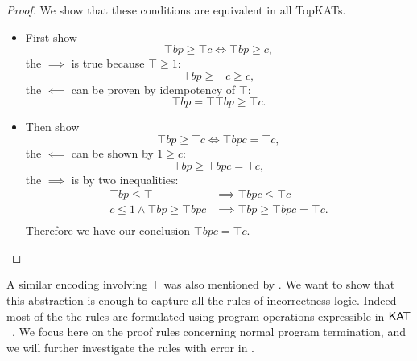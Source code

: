 \begin{proof}
We show that these conditions are equivalent in all TopKATs.
\begin{itemize}
    \item First show \[\top b p \geq \top c \iff \top b p \geq c,\]
    the \(\implies\) is true because \(\top \geq 1\):
    \[\top b p \geq \top c \geq c,\]
    the \(\impliedby\) can be proven by idempotency of \(\top\):
    \[\top b p = \top \top b p \geq \top c.\]
    \item Then show \[\top b p \geq \top c \iff \top b p c = \top c,\]
    the \(\impliedby\) can be shown by \(1 \geq c\):
    \[\top b p \geq \top b p c = \top c,\]
    the \(\implies\) is by two inequalities:
    \begin{align*}
        \top b p \leq \top & \implies \top b p c \leq \top c \\
        c \leq 1 \land \top b p \geq \top b p c & \implies \top b p \geq \top b p c = \top c.\\
    \end{align*}
    Therefore we have our conclusion \(\top b p c = \top c\). \qedhere
\end{itemize}
\end{proof}

A similar encoding involving \(\top\) was also mentioned by \citet{OHearn_2020}.
We want to show that this abstraction is enough to capture all the rules of
incorrectness logic.  Indeed most of the the rules are formulated using program
operations expressible in \(\mathsf{KAT}\) ~\cite{OHearn_2020}.  We
focus here on the proof rules concerning normal program termination, and we will
further investigate the rules with error in .


